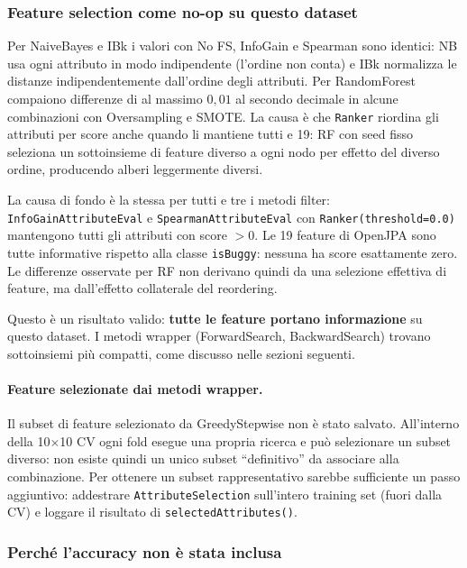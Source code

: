 \subsubsection{Feature selection come no-op su questo dataset}

Per NaiveBayes e IBk i valori con No FS, InfoGain e Spearman sono identici: NB usa ogni
attributo in modo indipendente (l'ordine non conta) e IBk normalizza le distanze
indipendentemente dall'ordine degli attributi. Per RandomForest compaiono differenze di
al massimo $0{,}01$ al secondo decimale in alcune combinazioni con Oversampling e SMOTE.
La causa è che \texttt{Ranker} riordina gli attributi per score anche quando li mantiene
tutti e 19: RF con seed fisso seleziona un sottoinsieme di feature diverso a ogni nodo
per effetto del diverso ordine, producendo alberi leggermente diversi.

La causa di fondo è la stessa per tutti e tre i metodi filter: \texttt{InfoGainAttributeEval}
e \texttt{SpearmanAttributeEval} con \texttt{Ranker(threshold=0.0)} mantengono tutti gli
attributi con score $> 0$. Le 19 feature di OpenJPA sono tutte informative rispetto alla
classe \texttt{isBuggy}: nessuna ha score esattamente zero. Le differenze osservate per RF
non derivano quindi da una selezione effettiva di feature, ma dall'effetto collaterale del
reordering.

Questo è un risultato valido: \textbf{tutte le feature portano informazione} su questo
dataset. I metodi wrapper (ForwardSearch, BackwardSearch) trovano sottoinsiemi più compatti,
come discusso nelle sezioni seguenti.

\paragraph{Feature selezionate dai metodi wrapper.}
Il subset di feature selezionato da GreedyStepwise non è stato salvato. All'interno della
10$\times$10 CV ogni fold esegue una propria ricerca e può selezionare un subset diverso:
non esiste quindi un unico subset ``definitivo'' da associare alla combinazione. Per
ottenere un subset rappresentativo sarebbe sufficiente un passo aggiuntivo: addestrare
\texttt{AttributeSelection} sull'intero training set (fuori dalla CV) e loggare il
risultato di \texttt{selectedAttributes()}.

\subsubsection{Perché l'accuracy non è stata inclusa}


